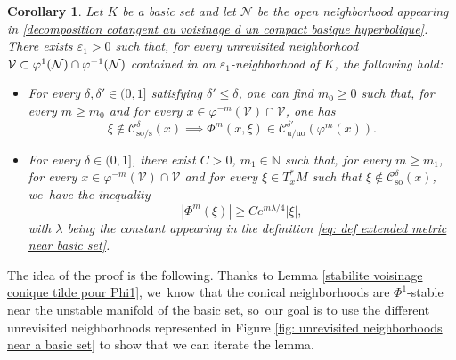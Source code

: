 \documentclass[11pt]{article}
\newcommand{\rs}{\mathrm{s}}
\newcommand{\rso}{\mathrm{so}}
\newcommand{\ru}{\mathrm{u}}
\newcommand{\ruo}{\mathrm{uo}}
\theoremstyle{definition}
\theoremstyle{plain}
\newtheorem{corollary}[definition]{Corollary}
\newcommand{\Ccal}{\mathcal{C}}
\newcommand{\Ncal}{\mathcal{N}}
\newcommand{\N}{\mathbb{N}}
\newcommand{\Vcal}{\mathcal{V}}
\begin{document}
\begin{corollary}\label{corollary big lemma} Let $K$ be a basic set and let $\Ncal$ be the open neighborhood appearing in \eqref{decomposition cotangent au voisinage d un compact basique hyperbolique}. There exists $\varepsilon_1 >0$ such that, for every unrevisited neighborhood $\Vcal\subset \varphi^1(\Ncal) \cap\nobreak\varphi^{-1}(\Ncal)$ contained in an $\varepsilon_1$-neighborhood of $K$, the following hold:
\begin{itemize}
\item For every $\delta,\delta'\in(0,1]$ satisfying $\delta' \leq \delta$, one can find $m_{0}\geq 0$ such that, for every $m \geq m_{0}$ and for every $x \in \varphi^{-m}(\Vcal)\cap \Vcal$, one has
\[
\xi \notin \Ccal_{\rso/\rs}^{\delta} (x) \implies \Phi^{ m} (x,\xi) \in \Ccal_{\ru/\ruo}^{\delta'} (\varphi^{m} (x)).
\]
\item For every $\delta\in(0,1]$, there exist $C > 0$, $m_1 \in \N$ such that, for every $m \geq m_1$, for every $x \in \varphi^{-m}(\Vcal)\cap \Vcal$ and for every $\xi \in T_x^* M$ such that $ \xi \notin \Ccal_{\rso}^{\delta} (x) $, we~have the inequality
\begin{equation}\label{eq: corollary big lemma - statement exponential estimates}
|\Phi^{ m} (\xi)| \geq C e^{m \lambda /4} |\xi|,
\end{equation}
with $\lambda$ being the constant appearing in the definition \eqref{eq: def extended metric near basic set}.
\end{itemize}
\end{corollary}

The idea of the proof is the following. Thanks to Lemma \ref{stabilite voisinage conique tilde pour Phi1}, we~know that the conical neighborhoods are $\Phi^1$-stable near the unstable manifold of the basic set, so~our goal is to use the different unrevisited neighborhoods represented in Figure \ref{fig: unrevisited neighborhoods near a basic set} to show that we can iterate the lemma.
\end{document}
